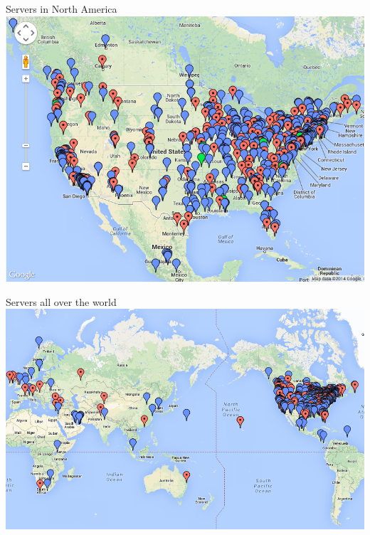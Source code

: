 \documentclass{beamer}
\begin{document}
\begin{frame}{Servers in North America}
\includegraphics[width=\textwidth]{mapUS}
\end{frame}

\begin{frame}{Servers all over the world}
\includegraphics[width=\textwidth]{mapWorld}

\end{frame}

\end{document}
